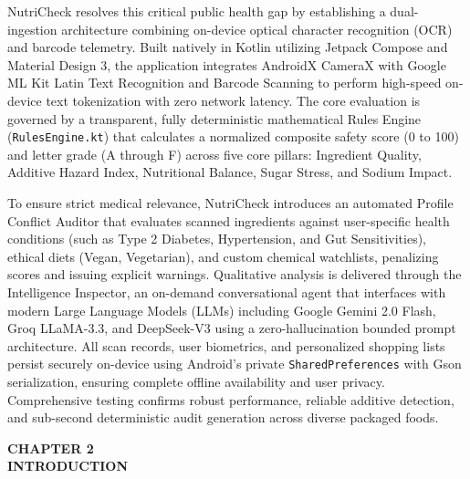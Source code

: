 \documentclass[12pt]{article}
\begin{document}
\vspace{0.3cm}

\noindent
NutriCheck resolves this critical public health gap by establishing a dual-ingestion architecture combining on-device optical character recognition (OCR) and barcode telemetry. Built natively in Kotlin utilizing Jetpack Compose and Material Design 3, the application integrates AndroidX CameraX with Google ML Kit Latin Text Recognition and Barcode Scanning to perform high-speed on-device text tokenization with zero network latency. The core evaluation is governed by a transparent, fully deterministic mathematical Rules Engine (\texttt{RulesEngine.kt}) that calculates a normalized composite safety score (0 to 100) and letter grade (A through F) across five core pillars: Ingredient Quality, Additive Hazard Index, Nutritional Balance, Sugar Stress, and Sodium Impact.

\vspace{0.3cm}

\noindent
To ensure strict medical relevance, NutriCheck introduces an automated Profile Conflict Auditor that evaluates scanned ingredients against user-specific health conditions (such as Type 2 Diabetes, Hypertension, and Gut Sensitivities), ethical diets (Vegan, Vegetarian), and custom chemical watchlists, penalizing scores and issuing explicit warnings. Qualitative analysis is delivered through the Intelligence Inspector, an on-demand conversational agent that interfaces with modern Large Language Models (LLMs) including Google Gemini 2.0 Flash, Groq LLaMA-3.3, and DeepSeek-V3 using a zero-hallucination bounded prompt architecture. All scan records, user biometrics, and personalized shopping lists persist securely on-device using Android's private \texttt{SharedPreferences} with Gson serialization, ensuring complete offline availability and user privacy. Comprehensive testing confirms robust performance, reliable additive detection, and sub-second deterministic audit generation across diverse packaged foods.

\newpage

\begin{center}
\textbf{\Large CHAPTER 2}\\[0.5cm]
\textbf{\Large INTRODUCTION}\\[1cm]
\end{center}
\end{document}
